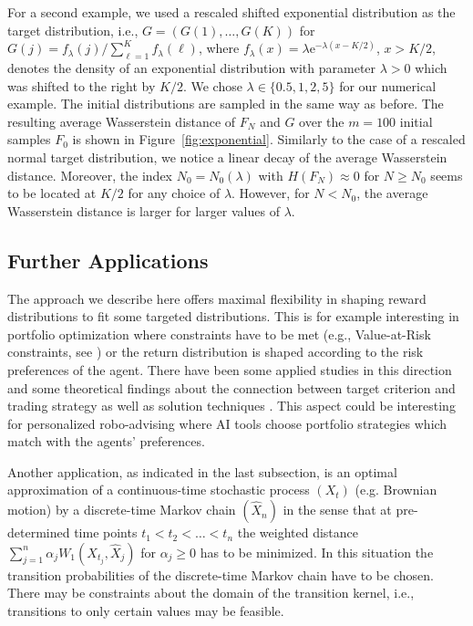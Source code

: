 \documentclass[reqno, 12pt]{amsart}%
\theoremstyle{definition}
\numberwithin{equation}{section} \numberwithin{theorem}{section}
\begin{document}
For a second example, we used a rescaled shifted exponential distribution as the target distribution, i.e., $G = (G(1),\ldots,G(K))$ for $G(j) = f_\lambda(j)/\sum_{\ell = 1}^K f_\lambda(\ell)$, where $f_\lambda(x) = \lambda \mathrm{e}^{-\lambda (x-K/2)}$, $x>K/2$, denotes the density of an exponential distribution with parameter $\lambda > 0$ which was shifted to the right by $K/2$. We chose $\lambda \in \{0.5,1,2,5\}$ for our numerical example. The initial distributions are sampled in the same way as before. The resulting average Wasserstein distance of $F_N$ and $G$ over the $m=100$ initial samples $F_0$ is shown in Figure~\ref{fig:exponential}. Similarly to the case of a rescaled normal target distribution, we notice a linear decay of the average Wasserstein distance. Moreover, the index $N_0 = N_0(\lambda)$ with $H(F_N) \approx 0$ for $N\geq N_0$ seems to be located at $K/2$ for any choice of $\lambda$. However, for $N<N_0$, the average Wasserstein distance is larger for larger values of $\lambda$.


\subsection{Further Applications}
The approach we describe here offers maximal flexibility in shaping reward distributions to fit some targeted distributions. This is for example interesting in portfolio optimization where constraints have to be met (e.g., Value-at-Risk constraints, see \cite{basak2001value}) or the return distribution is shaped according to the risk preferences of the agent. There have been some applied studies in this direction \cite{brayman2023profile} and some theoretical  findings about the connection between target criterion and trading strategy \cite{cox2014utility} as well as solution techniques \cite{he2011portfolio}. This aspect could be interesting for personalized robo-advising \cite{capponi2022personalized} where AI tools choose portfolio strategies which match with the agents' preferences.

Another application, as indicated in the last subsection, is an optimal approximation of a continuous-time stochastic process $(X_t)$ (e.g. Brownian motion) by a discrete-time Markov chain $(\hat X_n)$ in the sense that at pre-determined time points $t_1 < t_2<\ldots < t_n$ the weighted distance $\sum_{j=1}^n\alpha_j W_1(X_{t_j},\hat X_{j})$ for $\alpha_j \ge 0$ has to be minimized. In this situation the transition probabilities of the discrete-time Markov chain have to be chosen. There may be constraints about the domain of the transition kernel, i.e., 
transitions to only certain values may be feasible.
\end{document}
